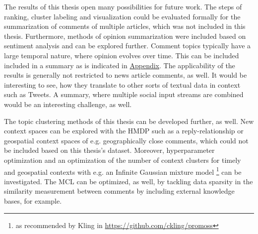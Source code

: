 The results of this thesis open many possibilities for future work. 
The steps of ranking, cluster labeling and visualization could be evaluated formally for the summarization of comments of multiple articles, which was not included in this thesis. Furthermore, methods of opinion summarization were included based on sentiment analysis and can be explored further. Comment topics typically have a large temporal nature, where opinion evolves over time. This can be included included in a summary as is indicated in \hyperref[topic_evo]{Appendix}. The applicability of the results is generally not restricted to news article comments, as well. It would be interesting to see, how they translate to other sorts of textual data in context such as Tweets. A summary, where multiple social input streams are combined would be an interesting challenge, as well. \par
The topic clustering methods of this thesis can be developed further, as well. New context spaces can be explored with the HMDP such as a reply-relationship or geospatial context spaces of e.g. geographically close comments, which could not be included based on this thesis's dataset. Moreover, hyperparameter optimization and an optimization of the number of context clusters for timely and geospatial contexts with e.g. an Infinite Gaussian mixture model \footnote{as recommended by Kling in \url{https://github.com/ckling/promoss}} can be investigated. The MCL can be optimized, as well, by tackling data sparsity in the similarity measurement between comments by including external knowledge bases, for example.
\clearpage